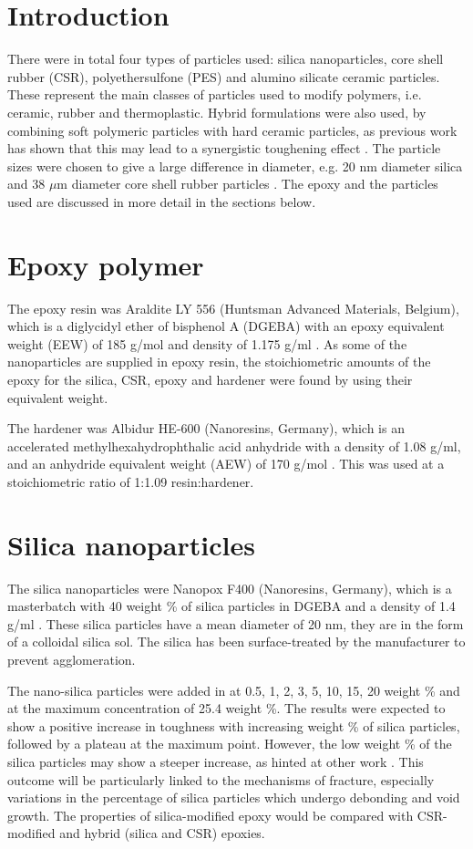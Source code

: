 \documentclass[numbers=noendperiod,chapterprefix=on]{icldt} %
\begin{document}
\section{Introduction}
There were in total four types of particles used: silica nanoparticles, core shell rubber (CSR), polyethersulfone (PES) and alumino silicate ceramic particles. These represent the main classes of particles used to modify polymers, i.e. ceramic, rubber and thermoplastic. Hybrid formulations were also used, by combining soft polymeric particles with hard ceramic particles, as previous work has shown that this may lead to a synergistic toughening effect \cite{Mohammed2008}. The particle sizes were chosen to give a large difference in diameter, e.g. 20 nm diameter silica and 38 $ \mu $m diameter core shell rubber particles . 
The epoxy and the particles used are discussed in more detail in the sections below.

\section{Epoxy polymer}
The epoxy resin was Araldite LY 556 (Huntsman Advanced Materials, Belgium), which is a diglycidyl ether of bisphenol A (DGEBA) with an epoxy equivalent weight (EEW) of 185 g/mol and density of 1.175 g/ml \cite{Huntsman2004}. 
As some of the nanoparticles are supplied in epoxy resin, the stoichiometric amounts of the epoxy for the silica, CSR, epoxy and hardener were found by using their equivalent weight.  

The hardener was Albidur HE-600 (Nanoresins, Germany), which is an accelerated methylhexahydrophthalic acid anhydride with a density of 1.08 g/ml, and an anhydride equivalent weight (AEW) of 170 g/mol \cite{Resins2006}. This was used at a stoichiometric ratio of 1:1.09 resin:hardener.

\section{Silica nanoparticles}

The silica nanoparticles were Nanopox F400 (Nanoresins, Germany), which is a masterbatch with 40 weight \% of silica particles in DGEBA and a density of 1.4 g/ml \cite{Industries2008}.
These silica particles have a mean diameter of 20 nm, they are in the form of a colloidal silica sol. The silica has been surface-treated by the manufacturer to prevent agglomeration.

The nano-silica particles were added in at 0.5, 1, 2, 3, 5, 10, 15, 20 weight \% and at the maximum concentration of 25.4 weight \%. The results were expected to show a positive increase in toughness with increasing weight \% of silica particles, followed by a plateau at the maximum point. However, the low weight \% of the silica particles may show a steeper increase, as hinted at other work \cite{Garg}. This outcome will be particularly linked to the mechanisms of fracture, especially variations in the percentage of silica particles which undergo debonding and void growth. The properties of silica-modified epoxy would be compared with CSR-modified and hybrid (silica and CSR) epoxies.
\end{document}
